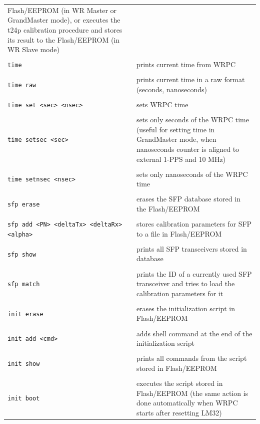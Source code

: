 \documentclass[a4paper, 12pt]{article}
\newcommand{\code}[1]{\texttt{#1}}
\newcommand{\codeHook}[1]{\mbox{\ttfamily\MakeTextUppercase{#1}}}
\begin{document}
\begin{longtable}{  p{8cm}  p{6cm} }
Flash/EEPROM (in \codeHook{wr} Master or GrandMaster mode), or executes the t24p
calibration procedure and stores its result to the Flash/EEPROM (in \codeHook{wr}
Slave mode)\\
 & \\
  \code{time} & prints current time from \codeHook{wrpc}\\
 & \\
  \code{time raw} &  prints current time in a raw format (seconds, nanoseconds)\\
 & \\
  \code{time set <sec> <nsec>} & sets \codeHook{wrpc} time\\
 & \\
  \code{time setsec <sec>} & sets only seconds of the \codeHook{wrpc} time
(useful for setting time in GrandMaster mode, when nanoseconds counter is
aligned to external 1-PPS and 10 MHz)\\
 & \\
  \code{time setnsec <nsec>} & sets only nanoseconds of the \codeHook{wrpc} time\\
 & \\
  \code{sfp erase} & erases the \codeHook{sfp} database stored in the Flash/EEPROM\\
 & \\
  \code{sfp add <PN> <deltaTx> <deltaRx> <alpha>} & stores calibration
parameters for \codeHook{sfp} to a file in Flash/EEPROM\\
 & \\
  \code{sfp show} & prints all \codeHook{sfp} transceivers stored in database\\
 & \\
  \code{sfp match} & prints the ID of a currently used \codeHook{sfp}
transceiver and tries to load the calibration parameters for it\\
 & \\
  \code{init erase} & erases the initialization script in Flash/EEPROM \\
 & \\
  \code{init add <cmd>} & adds shell command at the end of the
initialization script\\
 & \\
  \code{init show} & prints all commands from the script stored in Flash/EEPROM\\
 & \\
  \code{init boot} & executes the script stored in Flash/EEPROM (the same action is done automatically when \codeHook{wrpc} starts after resetting \codeHook{lm32})\\

\end{longtable}
\end{document}
